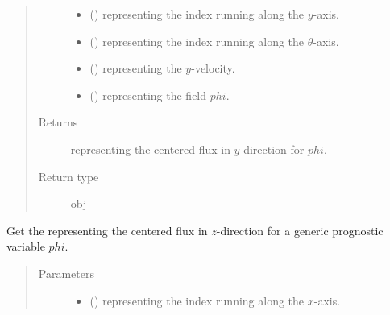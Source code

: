 \documentclass[letterpaper,10pt,english]{sphinxmanual}
\begin{document}
\begin{fulllineitems}
\begin{fulllineitems}
\begin{quote}
\begin{description}
\begin{itemize}
\item {} 
 () \textendash{}  representing the index running along the \(y\)-axis.

\item {} 
 () \textendash{}  representing the index running along the \(\theta\)-axis.

\item {} 
 () \textendash{}  representing the \(y\)-velocity.

\item {} 
 () \textendash{}  representing the field \(phi\).

\end{itemize}

\item[{Returns}] \leavevmode
{} representing the centered flux in \(y\)-direction for \(phi\).

\item[{Return type}] \leavevmode
obj

\end{description}\end{quote}

\end{fulllineitems}


\begin{fulllineitems}
\label{\detokenize{api:dycore.flux_isentropic_centered.FluxIsentropicCentered._get_centered_flux_z}}
Get the  representing the centered flux in \(z\)-direction
for a generic prognostic variable \(phi\).
\begin{quote}\begin{description}
\item[{Parameters}] \leavevmode\begin{itemize}
\item {} 
 () \textendash{}  representing the index running along the \(x\)-axis.


\end{itemize}
\end{description}
\end{quote}
\end{fulllineitems}
\end{fulllineitems}
\end{document}
